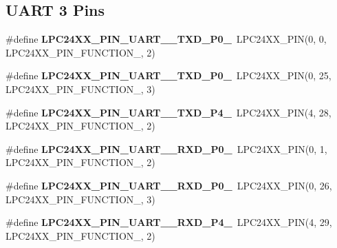 \subsection*{U\+A\+RT 3 Pins}
\begin{DoxyCompactItemize}
\item 
\mbox{\label{group__lpc24xx__io_ga1d8153a1009bbf21b9a3e909e7537170}} 
\#define {\bfseries L\+P\+C24\+X\+X\+\_\+\+P\+I\+N\+\_\+\+U\+A\+R\+T\+\_\+\_\+\+T\+X\+D\+\_\+\+P0\+\_}~L\+P\+C24\+X\+X\+\_\+\+P\+IN(0, 0, L\+P\+C24\+X\+X\+\_\+\+P\+I\+N\+\_\+\+F\+U\+N\+C\+T\+I\+O\+N\+\_, 2)
\item 
\mbox{\label{group__lpc24xx__io_ga0ccbf0ef329a29e1d8f63f87a6379a11}} 
\#define {\bfseries L\+P\+C24\+X\+X\+\_\+\+P\+I\+N\+\_\+\+U\+A\+R\+T\+\_\+\_\+\+T\+X\+D\+\_\+\+P0\+\_}~L\+P\+C24\+X\+X\+\_\+\+P\+IN(0, 25, L\+P\+C24\+X\+X\+\_\+\+P\+I\+N\+\_\+\+F\+U\+N\+C\+T\+I\+O\+N\+\_, 3)
\item 
\mbox{\label{group__lpc24xx__io_ga60c7501630d787e0213363719bb917cb}} 
\#define {\bfseries L\+P\+C24\+X\+X\+\_\+\+P\+I\+N\+\_\+\+U\+A\+R\+T\+\_\+\_\+\+T\+X\+D\+\_\+\+P4\+\_}~L\+P\+C24\+X\+X\+\_\+\+P\+IN(4, 28, L\+P\+C24\+X\+X\+\_\+\+P\+I\+N\+\_\+\+F\+U\+N\+C\+T\+I\+O\+N\+\_, 2)
\item 
\mbox{\label{group__lpc24xx__io_gaaf4c352f67302a52f70546e889721381}} 
\#define {\bfseries L\+P\+C24\+X\+X\+\_\+\+P\+I\+N\+\_\+\+U\+A\+R\+T\+\_\+\_\+\+R\+X\+D\+\_\+\+P0\+\_}~L\+P\+C24\+X\+X\+\_\+\+P\+IN(0, 1, L\+P\+C24\+X\+X\+\_\+\+P\+I\+N\+\_\+\+F\+U\+N\+C\+T\+I\+O\+N\+\_, 2)
\item 
\mbox{\label{group__lpc24xx__io_ga5315243724d125184889c18b1b58cd01}} 
\#define {\bfseries L\+P\+C24\+X\+X\+\_\+\+P\+I\+N\+\_\+\+U\+A\+R\+T\+\_\+\_\+\+R\+X\+D\+\_\+\+P0\+\_}~L\+P\+C24\+X\+X\+\_\+\+P\+IN(0, 26, L\+P\+C24\+X\+X\+\_\+\+P\+I\+N\+\_\+\+F\+U\+N\+C\+T\+I\+O\+N\+\_, 3)
\item 
\mbox{\label{group__lpc24xx__io_ga33934372945d4873ed82ee36faf3e929}} 
\#define {\bfseries L\+P\+C24\+X\+X\+\_\+\+P\+I\+N\+\_\+\+U\+A\+R\+T\+\_\+\_\+\+R\+X\+D\+\_\+\+P4\+\_}~L\+P\+C24\+X\+X\+\_\+\+P\+IN(4, 29, L\+P\+C24\+X\+X\+\_\+\+P\+I\+N\+\_\+\+F\+U\+N\+C\+T\+I\+O\+N\+\_, 2)
\end{DoxyCompactItemize}


